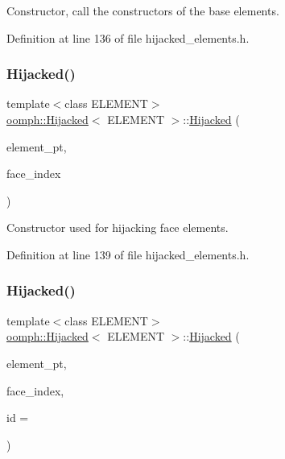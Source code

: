 Constructor, call the constructors of the base elements. 



Definition at line 136 of file hijacked\+\_\+elements.\+h.

\mbox{\label{classoomph_1_1Hijacked_a5e4aa47011d8141757f9ecbd8f787811}} 
\subsubsection{\texorpdfstring{Hijacked()}{Hijacked()}\hspace{0.1cm}{\footnotesize\ttfamily [2/3]}}
{\footnotesize\ttfamily template$<$class E\+L\+E\+M\+E\+NT$>$ \\
\hyperlink{classoomph_1_1Hijacked}{oomph\+::\+Hijacked}$<$ E\+L\+E\+M\+E\+NT $>$\+::\hyperlink{classoomph_1_1Hijacked}{Hijacked} (\begin{DoxyParamCaption}\item[{\hyperlink{classoomph_1_1FiniteElement}{Finite\+Element} $\ast$const \&}]{element\+\_\+pt,  }\item[{const int \&}]{face\+\_\+index }\end{DoxyParamCaption})\hspace{0.3cm}{\ttfamily [inline]}}



Constructor used for hijacking face elements. 



Definition at line 139 of file hijacked\+\_\+elements.\+h.

\mbox{\label{classoomph_1_1Hijacked_ac03d9be9ce8252556d41ef643b3658be}} 
\subsubsection{\texorpdfstring{Hijacked()}{Hijacked()}\hspace{0.1cm}{\footnotesize\ttfamily [3/3]}}
{\footnotesize\ttfamily template$<$class E\+L\+E\+M\+E\+NT$>$ \\
\hyperlink{classoomph_1_1Hijacked}{oomph\+::\+Hijacked}$<$ E\+L\+E\+M\+E\+NT $>$\+::\hyperlink{classoomph_1_1Hijacked}{Hijacked} (\begin{DoxyParamCaption}\item[{\hyperlink{classoomph_1_1FiniteElement}{Finite\+Element} $\ast$const \&}]{element\+\_\+pt,  }\item[{const int \&}]{face\+\_\+index,  }\item[{const unsigned \&}]{id = {} }\end{DoxyParamCaption})\hspace{0.3cm}{\ttfamily [inline]}}



